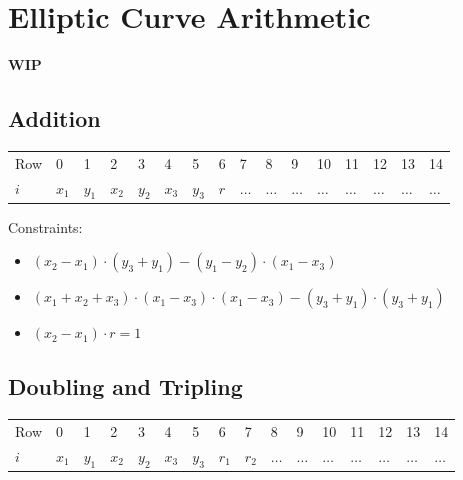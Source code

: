 \section{Elliptic Curve Arithmetic}
\label{section:ec}
\textbf{WIP}

\subsection{Addition}

\begin{center}
\begin{table}[H]
\begin{tabular}{llllllllllllllll}
 Row  & 0 & 1 & 2 & 3 & 4 & 5 & 6 & 7 & 8 & 9 & 10 & 11 & 12 & 13 & 14 \\
 $i$ 	  & $x_1$ & $y_1$ & $x_2$ & $y_2$ & $x_3$ & $y_3$ & $r$ & $\dots$ & $\dots$ & $\dots$ & $\dots$ & $\dots$ & $\dots$ & $\dots$ & $\dots$ \\
\end{tabular}
\end{table}
\end{center}

Constraints:
\begin{itemize}
	\item $(x_2 - x_1) \cdot (y_3 + y_1) - (y_1 - y_2) \cdot (x_1 - x_3)$
	\item $(x_1 + x_2 + x_3) \cdot (x_1 - x_3) \cdot (x_1 - x_3) - (y_3 + y_1) \cdot (y_3 + y_1)$
	\item $(x_2 - x_1) \cdot r = 1$
\end{itemize}

\subsection{Doubling and Tripling}

\begin{center}
\begin{table}[H]
\begin{tabular}{llllllllllllllll}
 Row  & 0 & 1 & 2 & 3 & 4 & 5 & 6 & 7 & 8 & 9 & 10 & 11 & 12 & 13 & 14 \\
 $i$ 	  & $x_1$ & $y_1$ & $x_2$ & $y_2$ & $x_3$ & $y_3$ & $r_1$ & $r_2$ & $\dots$ & $\dots$ & $\dots$ & $\dots$ & $\dots$ & $\dots$ & $\dots$ \\
\end{tabular}
\end{table}
\end{center}

